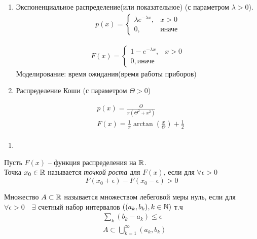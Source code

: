 \begin{example}
\begin{enumerate}
		\item Экспоненциальное распределение(или показательное) (с параметром $\lambda > 0$).
			\begin{align*}
				p(x) = 
				\begin{cases}
					\lambda e^{-\lambda x}, &x > 0\\
					0, &\text{иначе}
				\end{cases}
			\end{align*}

			\begin{align*}
				F(x) =
				\begin{cases}
					1 - e^{-\lambda x}, &x > 0\\
					0, \text{иначе}
				\end{cases}
			\end{align*}
			Моделирование: время ожидания(время работы приборов)
		
		\item Распределение Коши (с параметром $\Theta > 0$)
		
		\begin{align*}
			&p(x) = \frac{\Theta}{\pi (\Theta^2 + x^2)}\\
			&F(x) = \frac{1}{\pi} \arctan \left( \frac{x}{\Theta} \right) + \frac{1}{2}\\
		\end{align*}
	\end{enumerate}
\end{example}

\begin{enumerate}[resume*=distributions]
	\item {}
\end{enumerate}

\begin{definition}
	Пусть $F(x)$ -- функция распределения на $\mathbb{R}$.\\ 
	Точка $x_0 \in \mathbb{R}$ называется \emph{точкой роста} для $F(x)$, если для $\forall \epsilon > 0$
	\begin{equation*}
		F(x_0 + \epsilon) - F(x_0 - \epsilon) > 0
	\end{equation*}
\end{definition}

\begin{definition}
	Множество $A \subset \mathbb{R}$ называется множеством лебеговой меры нуль, если для $\forall \epsilon > 0 \quad \exists$ счетный набор интервалов $((a_k, b_k), k \in \mathbb{N})$ т.ч 
	\begin{align*}
		&\sum_k (b_k - a_k) \leq \epsilon\\
		&A \subset \bigcup_{k = 1}^{\infty} (a_k, b_k)
	\end{align*}
\end{definition}

